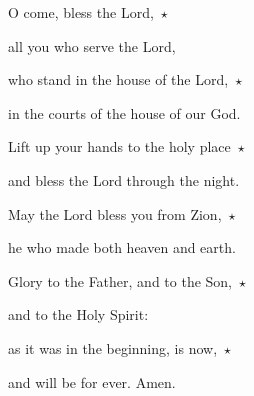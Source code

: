 O come, bless the Lord,~$\star$~\nopagebreak

all you who serve the Lord,

who stand in the house of the Lord,~$\star$~\nopagebreak

in the courts of the house of our God.

Lift up your hands to the holy place~$\star$~\nopagebreak

and bless the Lord through the night.

May the Lord bless you from Zion,~$\star$~\nopagebreak

he who made both heaven and earth.

\noindent Glory to the Father, and to the Son,~$\star$~\nopagebreak

and to the Holy Spirit:

\noindent as it was in the beginning, is now,~$\star$~\nopagebreak

and will be for ever. Amen.
